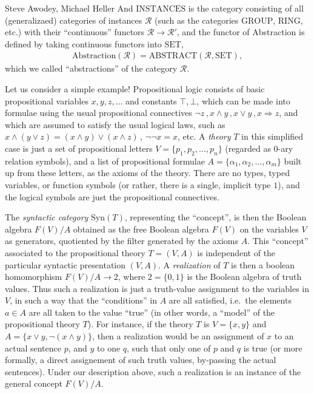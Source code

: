\begin{artengenv2auth}{Steve Awodey, Michael Heller}
And $\mathrm{INSTANCES}$ is the category consisting of all (generalizaed) categories of instances $\mathcal{R}$ (such as the categories $\mathrm{GROUP}$, $\mathrm{RING}$, etc.) with their ``continuous'' functors  $\mathcal{R} \to \mathcal{R'}$, and the functor of Abstraction is defined by taking continuous functors into $\mathrm{SET}$, 
\begin{align*}
\mathrm{Abstraction}(\mathcal{R}) = \mathrm{ABSTRACT}(\mathcal{R}, \mathrm{SET}),
\end{align*}
which we called ``abstractions'' of the category $\mathcal{R}$. 

Let us consider a simple example!  Propositional logic consists of basic propositional variables $x, y, z, \dots$ and constants $\top, \bot$, which can be made into formulae using the usual propositional connectives $\neg z\,, x \wedge y\,, x\vee y\,, x\Rightarrow z$, and which are assumed to satisfy the usual logical laws, such as $x \wedge (y\vee z) = (x \wedge y)\vee (x \wedge z)$\,, $\neg\neg x = x$, etc.  A \emph{theory} $T$ in this simplified case is just a set of propositional letters $V = \{p_1, p_2, \dots, p_n\}$ (regarded as $0$-ary relation symbols), and a list of propositional formulae $A = \{\alpha_1, \alpha_2, \dots, \alpha_m\}$ built up from these letters, as the axioms of the theory.  There are no types, typed variables, or function symbols (or rather, there is a single, implicit type $1$), and the logical symbols are just the propositional connectives.

The \emph{syntactic category} $\mathrm{Syn}(T)$, representing the ``concept'',  is then the Boolean algebra $F(V)/A$ obtained as the free Boolean algebra $F(V)$ on the variables $V$ as generators, quotiented by the filter generated by the axioms $A$.  This ``concept'' associated to the propositional theory $T = (V,A)$ is independent of the particular syntactic presentation $(V,A)$.  A \emph{realization} of $T$ is then a boolean homomorphism $F(V)/A \to 2$, where $2 = \{0,1\}$ is the Boolean algebra of truth values.  Thus such a realization is just a truth-value assignment to the variables in $V$, in such a way that the ``conditions'' in $A$ are all satisfied, i.e.\ the elements $a\in A$ are all taken to the value ``true'' (in other words, a ``model'' of the propositional theory $T$).  For instance, if the theory $T$ is $V= \{x, y\}$ and $A = \{x\vee y, \neg(x\wedge y)\}$, then a realization would be an assignment of $x$ to an actual sentence $p$, and $y$ to one $q$, such that only one of $p$ and $q$ is true (or more formally, a direct assignement of such truth values, by-passing the actual sentences).  Under our description above, such a realization is an instance of the general concept $F(V)/A$.


\end{artengenv2auth}

